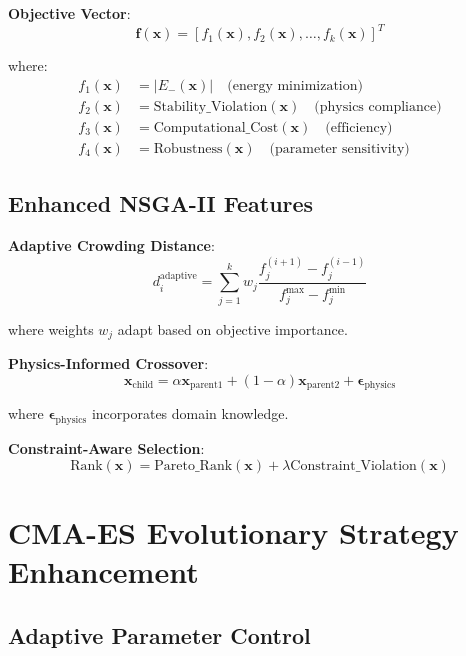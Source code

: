 \documentclass[11pt,a4paper]{article}
\begin{document}
\textbf{Objective Vector}:
\begin{equation}
\mathbf{f}(\mathbf{x}) = [f_1(\mathbf{x}), f_2(\mathbf{x}), \ldots, f_k(\mathbf{x})]^T
\end{equation}

where:
\begin{align}
f_1(\mathbf{x}) &= |E_-(\mathbf{x})| \quad \text{(energy minimization)} \\
f_2(\mathbf{x}) &= \text{Stability\_Violation}(\mathbf{x}) \quad \text{(physics compliance)} \\
f_3(\mathbf{x}) &= \text{Computational\_Cost}(\mathbf{x}) \quad \text{(efficiency)} \\
f_4(\mathbf{x}) &= \text{Robustness}(\mathbf{x}) \quad \text{(parameter sensitivity)}
\end{align}

\subsection{Enhanced NSGA-II Features}

\textbf{Adaptive Crowding Distance}:
\begin{equation}
d_i^{\text{adaptive}} = \sum_{j=1}^k w_j \frac{f_j^{(i+1)} - f_j^{(i-1)}}{f_j^{\max} - f_j^{\min}}
\end{equation}

where weights $w_j$ adapt based on objective importance.

\textbf{Physics-Informed Crossover}:
\begin{equation}
\mathbf{x}_{\text{child}} = \alpha \mathbf{x}_{\text{parent1}} + (1-\alpha) \mathbf{x}_{\text{parent2}} + \boldsymbol{\epsilon}_{\text{physics}}
\end{equation}

where $\boldsymbol{\epsilon}_{\text{physics}}$ incorporates domain knowledge.

\textbf{Constraint-Aware Selection}:
\begin{equation}
\text{Rank}(\mathbf{x}) = \text{Pareto\_Rank}(\mathbf{x}) + \lambda \text{Constraint\_Violation}(\mathbf{x})
\end{equation}

\section{CMA-ES Evolutionary Strategy Enhancement}

\subsection{Adaptive Parameter Control}
\end{document}
